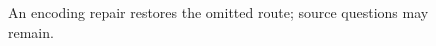 \begin{figure}[H]
\centering
{}
\caption{An encoding repair restores the omitted route; source questions may remain.}\label{fig:teach-M06-20}
\end{figure}
